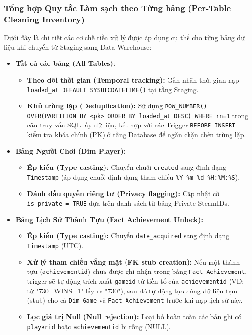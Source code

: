 \subsubsection{Tổng hợp Quy tắc Làm sạch theo Từng bảng (Per-Table Cleaning Inventory)}

Dưới đây là chi tiết các cơ chế tiền xử lý được áp dụng cụ thể cho từng bảng dữ liệu khi chuyển từ Staging sang Data Warehouse:

\begin{itemize}
    \item \textbf{Tất cả các bảng (All Tables):}
    \begin{itemize}
        \item \textbf{Theo dõi thời gian (Temporal tracking):} Gắn nhãn thời gian nạp \texttt{loaded\_at DEFAULT SYSUTCDATETIME()} tại tầng Staging.
        \item \textbf{Khử trùng lặp (Deduplication):} Sử dụng \texttt{ROW\_NUMBER() OVER(PARTITION BY <pk> ORDER BY loaded\_at DESC) WHERE rn=1} trong câu truy vấn SQL lấy dữ liệu, kết hợp với các Trigger \texttt{BEFORE INSERT} kiểm tra khóa chính (PK) ở tầng Database để ngăn chặn chèn trùng lặp.
    \end{itemize}

    \item \textbf{Bảng Người Chơi (Dim Player):}
    \begin{itemize}
        \item \textbf{Ép kiểu (Type casting):} Chuyển chuỗi \texttt{created} sang định dạng \texttt{Timestamp} (áp dụng chuỗi định dạng tham chiếu \texttt{\%Y-\%m-\%d \%H:\%M:\%S}).
        \item \textbf{Đánh dấu quyền riêng tư (Privacy flagging):} Cập nhật cờ \texttt{is\_private = TRUE} dựa trên danh sách từ bảng Private SteamIDs.
    \end{itemize}

    \item \textbf{Bảng Lịch Sử Thành Tựu (Fact Achievement Unlock):}
    \begin{itemize}
        \item \textbf{Ép kiểu (Type casting):} Chuyển \texttt{date\_acquired} sang định dạng \texttt{Timestamp} (UTC).
        \item \textbf{Xử lý tham chiếu vắng mặt (FK stub creation):} Nếu một thành tựu (\texttt{achievementid}) chưa được ghi nhận trong bảng \texttt{Fact Achievement}, trigger sẽ tự động trích xuất \texttt{gameid} từ tiền tố của \texttt{achievementid} (VD: từ "730\_WINS\_1" lấy ra "730"), sau đó tự động tạo dòng dữ liệu tạm (stub) cho cả \texttt{Dim Game} và \texttt{Fact Achievement} trước khi nạp lịch sử này.
        \item \textbf{Lọc giá trị Null (Null rejection):} Loại bỏ hoàn toàn các bản ghi có \texttt{playerid} hoặc \texttt{achievementid} bị rỗng (NULL).
    \end{itemize}


\end{itemize}
